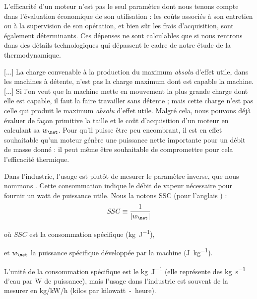 		L’efficacité d’un moteur n’est pas le seul paramètre dont nous tenons compte dans l’évaluation économique de son utilisation : les coûts associés à son entretien ou à la supervision de son opération, et bien sûr les frais d’acquisition, sont également déterminants. Ces dépenses ne sont calculables que si nous rentrons dans des détails technologiques qui dépassent le cadre de notre étude de la thermodynamique.
		
			[...] La charge convenable à la production du maximum \emph{absolu} d’effet utile, dans les machines à détente, n’est pas la charge maximum dont est capable la machine. [...] Si l’on veut que la machine mette en mouvement la plus grande charge dont elle est capable, il faut la faire travailler sans détente ; mais cette charge n’est pas celle qui produit le maximum \emph{absolu} d’effet utile.
		Malgré cela, nous pouvons déjà évaluer de façon primitive la taille et le coût d’acquisition d’un moteur en calculant sa  $w_\net$. Pour qu’il puisse être peu encombrant, il est en effet souhaitable qu’un moteur génère une puissance nette importante pour un débit de masse donné : il peut même être souhaitable de compromettre pour cela l’efficacité thermique.
			
		Dans l’industrie, l’usage est plutôt de mesurer le paramètre inverse, que nous nommons . Cette consommation indique le débit de vapeur nécessaire pour fournir un watt de puissance utile. Nous la notons SSC (pour l’anglais ) :
		\begin{equation}
			\mathit{SSC} \equiv \frac{1}{|w_\net|}
		\end{equation}
		\begin{equationterms}
			\item où \tab $SSC$ 		\tab est la consommation spécifique (\si{\kilogram\per\joule}),
			\item et \tab $w_\net$ 	\tab la puissance spécifique développée par la machine (\si{\joule\per\kilogram}).
		\end{equationterms}

		L’unité de la consommation spécifique est le \si{\kilogram\per\joule} (elle représente des \si{\kilogram\per\second} d’eau par \si{\watt} de puissance), mais l’usage dans l’industrie est souvent de la mesurer en \si[per-mode = symbol]{\kilogram\per\kilo\watt\per\hour} (\si{kilos} par \si{kilowatt-heure}).

